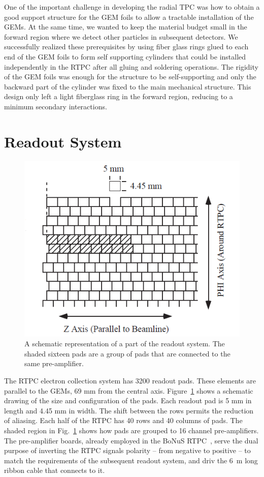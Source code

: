 \documentclass[preprint,5p]{elsarticle}
\begin{document}
One of the important challenge in developing the radial TPC was how to obtain a 
good support structure for the GEM foils to allow a tractable 
installation of the GEMs. At the same time, we wanted to 
keep the material budget small in the forward region where we detect other 
particles in subsequent detectors. We successfully realized these prerequisites 
by using fiber glass rings glued to each end of the GEM foils to form self 
supporting cylinders that could be installed independently in the RTPC after 
all gluing and soldering operations. The rigidity of the GEM foils was enough
for the structure to be self-supporting and only the backward part of the 
cylinder was fixed to the main mechanical structure. This design only left a 
light fiberglass ring in the forward region, reducing to a minimum secondary 
interactions.

\section{Readout System} \label{sec_readout}

\begin{figure}[tb]
   \centering
   \includegraphics[scale=0.55]{fig/PADs.png}
   \caption[]{A schematic representation of a part of the readout system.  The 
   shaded sixteen pads are a group of pads that are connected to the same 
pre-amplifier.} \label{fig:PADs}
\end{figure}

The RTPC electron collection system has 3200 readout pads. These elements are
parallel to the GEMs, 69 mm from the central axis.
Figure~\ref{fig:PADs} shows a schematic drawing of the size and 
configuration of the pads. Each readout pad is 5 mm in length and 4.45 mm in 
width. The shift between the rows permits the reduction of aliasing. Each half of the 
RTPC has 40 rows and 40 columns of pads. The shaded region in Fig.~\ref{fig:PADs} 
shows how pads are grouped to 16 channel pre-amplifiers. The pre-amplifier boards, 
already employed in the BoNuS RTPC~\cite{BONUS-NIM}, serve the dual purpose of 
inverting the RTPC signals polarity -- from negative to positive -- to match the 
requirements of the subsequent readout system, and driv the 6~m long ribbon 
cable that connects to it.
\end{document}
